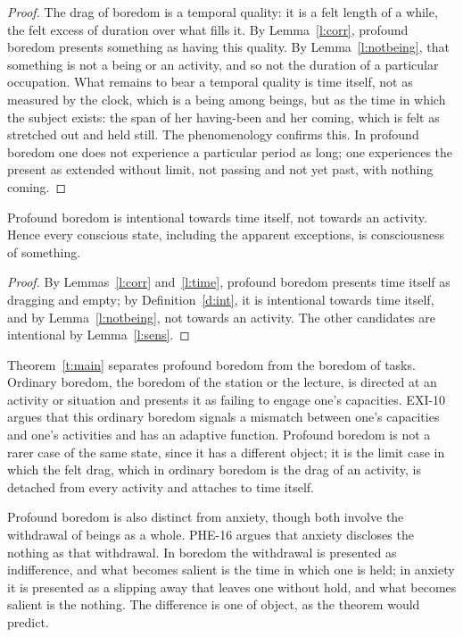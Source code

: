 \documentclass{situationist-preprint}
\begin{document}
\begin{proof}
The drag of boredom is a temporal quality: it is a felt length of a while, the felt excess of duration over what fills it. By Lemma~\ref{l:corr}, profound boredom presents something as having this quality. By Lemma~\ref{l:notbeing}, that something is not a being or an activity, and so not the duration of a particular occupation. What remains to bear a temporal quality is time itself, not as measured by the clock, which is a being among beings, but as the time in which the subject exists: the span of her having-been and her coming, which is felt as stretched out and held still. The phenomenology confirms this. In profound boredom one does not experience a particular period as long; one experiences the present as extended without limit, not passing and not yet past, with nothing coming.
\end{proof}

\begin{theorem}\label{t:main}
Profound boredom is intentional towards time itself, not towards an activity. Hence every conscious state, including the apparent exceptions, is consciousness of something.
\end{theorem}

\begin{proof}
By Lemmas~\ref{l:corr} and~\ref{l:time}, profound boredom presents time itself as dragging and empty; by Definition~\ref{d:int}, it is intentional towards time itself, and by Lemma~\ref{l:notbeing}, not towards an activity. The other candidates are intentional by Lemma~\ref{l:sens}.
\end{proof}

\begin{remark}\label{r:ordinary}
Theorem~\ref{t:main} separates profound boredom from the boredom of tasks. Ordinary boredom, the boredom of the station or the lecture, is directed at an activity or situation and presents it as failing to engage one's capacities. EXI-10 argues that this ordinary boredom signals a mismatch between one's capacities and one's activities and has an adaptive function. Profound boredom is not a rarer case of the same state, since it has a different object; it is the limit case in which the felt drag, which in ordinary boredom is the drag of an activity, is detached from every activity and attaches to time itself.
\end{remark}

\begin{remark}\label{r:anxiety}
Profound boredom is also distinct from anxiety, though both involve the withdrawal of beings as a whole. PHE-16 argues that anxiety discloses the nothing as that withdrawal. In boredom the withdrawal is presented as indifference, and what becomes salient is the time in which one is held; in anxiety it is presented as a slipping away that leaves one without hold, and what becomes salient is the nothing. The difference is one of object, as the theorem would predict.
\end{remark}
\end{document}
